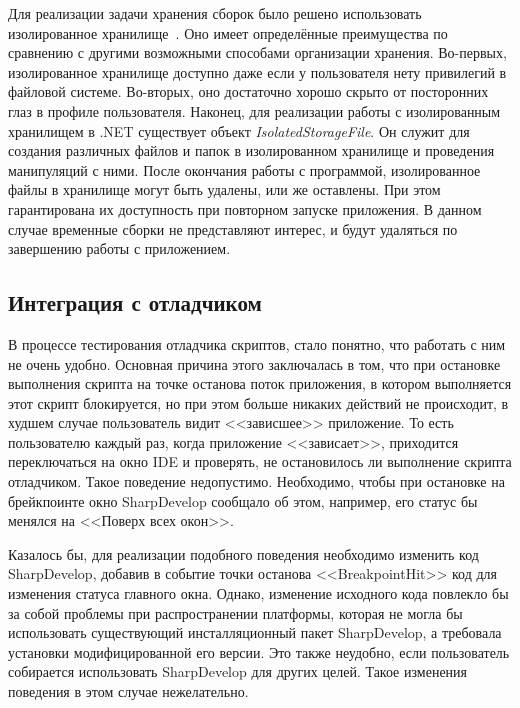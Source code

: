 Для реализации задачи хранения сборок было решено использовать изолированное хранилище~\cite{cs2010-dotnet40}. Оно имеет определённые преимущества по сравнению с другими возможными способами организации хранения. Во-первых, изолированное хранилище доступно даже если у пользователя нету привилегий в файловой системе. Во-вторых, оно достаточно хорошо скрыто от посторонних глаз в профиле пользователя. Наконец, для реализации работы с изолированным хранилищем в .NET существует объект {\it IsolatedStorageFile}. Он служит для создания различных файлов и папок в изолированном хранилище и проведения манипуляций с ними. После окончания работы с программой, изолированное файлы в хранилище могут быть удалены, или же оставлены. При этом гарантирована их доступность при повторном запуске приложения. В данном случае временные сборки не представляют интерес, и будут удаляться по завершению работы с приложением.

 
\subsection{Интеграция с отладчиком}
\label{sec:sd_debug}

В процессе тестирования отладчика скриптов, стало понятно, что работать с ним не очень удобно. Основная причина этого заключалась в том, что при остановке выполнения скрипта на точке останова поток приложения, в котором выполняется этот скрипт блокируется, но при этом больше никаких действий не происходит, в худшем случае пользователь видит <<зависшее>> приложение. То есть пользователю каждый раз, когда приложение <<зависает>>, приходится переключаться на окно IDE и проверять, не остановилось ли выполнение скрипта отладчиком. Такое поведение недопустимо. Необходимо, чтобы при остановке на брейкпоинте окно SharpDevelop сообщало об этом, например, его статус бы менялся на <<Поверх всех окон>>.

Казалось бы, для реализации подобного поведения необходимо изменить код SharpDevelop, добавив в событие точки останова <<BreakpointHit>> код для изменения статуса главного окна. Однако, изменение исходного кода повлекло бы за собой проблемы при распространении платформы, которая не могла бы использовать существующий инсталляционный пакет SharpDevelop, а требовала установки модифицированной его версии. Это также неудобно, если пользователь собирается использовать SharpDevelop для других целей. Такое изменения поведения в этом случае нежелательно.

